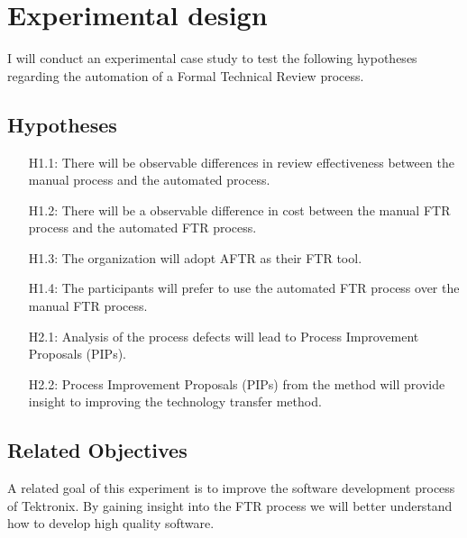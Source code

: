 
\section{Experimental design}
\label{sec:experiment}

I will conduct an experimental case study to test the following hypotheses
regarding the automation of a Formal Technical Review process.
\subsection{Hypotheses}
\begin{enumerate}
\item[H1.1:]{There will be observable differences in review
effectiveness between the manual process and the automated process.}
\item[H1.2:]{There will be a observable difference in cost between
the manual FTR process and the automated FTR process.}
\item[H1.3:]{The organization will adopt AFTR as their FTR tool.}
\item[H1.4:]{The participants will prefer to use the automated FTR
process over the manual FTR process.}
\item[H2.1:]{Analysis of the process defects will lead to Process
Improvement Proposals (PIPs).}
\item[H2.2:]{Process Improvement Proposals (PIPs) from the method will
provide insight to improving the technology transfer method.}
\end{enumerate}
\subsection{Related Objectives}

A related goal of this experiment is to improve the software development
process  of Tektronix.  By gaining insight into the FTR process we will
better understand how to develop high quality software.

